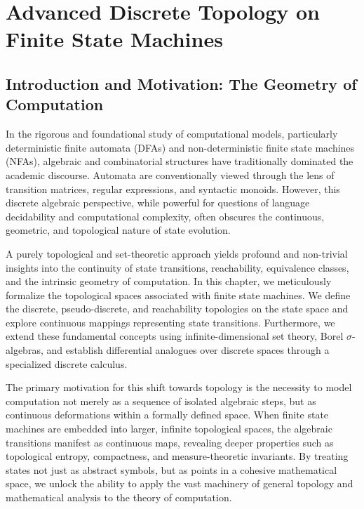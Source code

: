 \chapter{Advanced Discrete Topology on Finite State Machines}
\label{ch:advanced_discrete_topology}

\section{Introduction and Motivation: The Geometry of Computation}

In the rigorous and foundational study of computational models, particularly deterministic finite automata (DFAs) and non-deterministic finite state machines (NFAs), algebraic and combinatorial structures have traditionally dominated the academic discourse. Automata are conventionally viewed through the lens of transition matrices, regular expressions, and syntactic monoids. However, this discrete algebraic perspective, while powerful for questions of language decidability and computational complexity, often obscures the continuous, geometric, and topological nature of state evolution. 

A purely topological and set-theoretic approach yields profound and non-trivial insights into the continuity of state transitions, reachability, equivalence classes, and the intrinsic geometry of computation. In this chapter, we meticulously formalize the topological spaces associated with finite state machines. We define the discrete, pseudo-discrete, and reachability topologies on the state space and explore continuous mappings representing state transitions. Furthermore, we extend these fundamental concepts using infinite-dimensional set theory, Borel $\sigma$-algebras, and establish differential analogues over discrete spaces through a specialized discrete calculus.

The primary motivation for this shift towards topology is the necessity to model computation not merely as a sequence of isolated algebraic steps, but as continuous deformations within a formally defined space. When finite state machines are embedded into larger, infinite topological spaces, the algebraic transitions manifest as continuous maps, revealing deeper properties such as topological entropy, compactness, and measure-theoretic invariants. By treating states not just as abstract symbols, but as points in a cohesive mathematical space, we unlock the ability to apply the vast machinery of general topology and mathematical analysis to the theory of computation.

